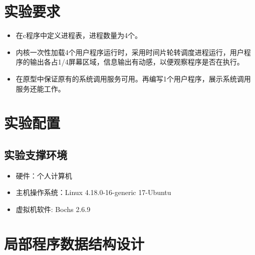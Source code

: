 \documentclass[a4paper,11pt,UTF8]{ctexart}
\begin{document}
\section{实验要求}
	\begin{itemize}
		\item 在c程序中定义进程表，进程数量为4个。
		\item 内核一次性加载4个用户程序运行时，采用时间片轮转调度进程运行，用户程序的输出各占1/4屏幕区域，信息输出有动感，以便观察程序是否在执行。
		\item 在原型中保证原有的系统调用服务可用。再编写1个用户程序，展示系统调用服务还能工作。
	\end{itemize}

\section{实验配置}

	\subsection{实验支撑环境}
		\begin{itemize} 
			\item 硬件：个人计算机
			\item 主机操作系统：Linux 4.18.0-16-generic 17-Ubuntu
			\item 虚拟机软件: Bochs 2.6.9
		\end{itemize}
	
	
	 
\section{局部程序数据结构设计}
\end{document}

